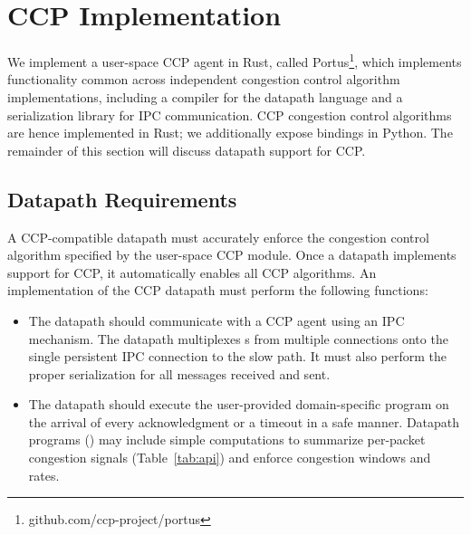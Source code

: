 \section{CCP Implementation}
\label{s:datapath}

We implement a user-space CCP agent in Rust, called Portus\footnote{github.com/ccp-project/portus}, which implements functionality common across independent congestion control algorithm implementations, including a compiler for the datapath language and a serialization library for IPC communication.
CCP congestion control algorithms are hence implemented in Rust; we additionally expose bindings in Python. The remainder of this section will discuss datapath support for CCP.

\subsection{Datapath Requirements}
\label{sec:implementation-basics}
A CCP-compatible datapath must accurately enforce the congestion
control algorithm specified by the user-space CCP module.
Once a datapath implements
support for CCP, it automatically enables all CCP algorithms.
An implementation of the CCP datapath must perform the following functions:
\begin{itemize}
\item The datapath should communicate with a \userspace CCP agent using an IPC
  mechanism. The datapath multiplexes s from multiple connections
  onto the single persistent IPC connection to the slow path. It must also perform
  the proper serialization for all messages received and sent.
\item The datapath should execute the user-provided domain-specific program on
  the arrival of every acknowledgment or a timeout in a safe manner. Datapath
  programs () may include simple computations to summarize
  per-packet congestion signals (Table~\ref{tab:api}) and enforce congestion
  windows and rates.
\end{itemize}

